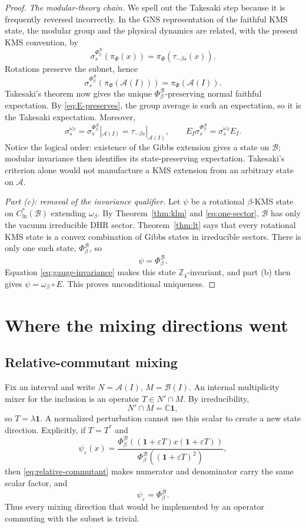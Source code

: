 \documentclass[11pt]{article}
\theoremstyle{remark}
\newcommand{\A}{\mathcal A}
\newcommand{\B}{\mathcal B}
\newcommand{\C}{\mathbb C}
\newcommand{\Z}{\mathbb Z}
\newcommand{\id}{\mathbf 1}
\begin{document}
\begin{proof}
\emph{The modular-theory chain.}
We spell out the Takesaki step because it is frequently reversed
incorrectly.  In the GNS representation of the faithful KMS state,
the modular group and the physical dynamics are related, with the
present KMS convention, by
\[
 \sigma_s^{\Phi_\beta^{\B}}(\pi_\Phi(x))
 =\pi_\Phi(\tau_{-\beta s}(x)).
\tag{4.6}\label{eq:kms-modular}
\]
Rotations preserve the subnet, hence
\[
 \sigma_s^{\Phi_\beta^{\B}}
   (\pi_\Phi(\A(I)))=\pi_\Phi(\A(I)).
\]
Takesaki's theorem now gives the unique
$\Phi_\beta^{\B}$-preserving normal faithful expectation.  By
\eqref{eq:E-preserves}, the group average is such an expectation, so
it is the Takesaki expectation.  Moreover,
\[
 \sigma_s^{\omega_\beta}
 =\sigma_s^{\Phi_\beta^{\B}}|_{\A(I)}
 =\tau_{-\beta s}|_{\A(I)},\qquad
 E_I\sigma_s^{\Phi_\beta^{\B}}
 =\sigma_s^{\omega_\beta}E_I.
\tag{4.7}\label{eq:modular-chain}
\]
Notice the logical order: existence of the Gibbs extension gives a
state on $\B$; modular invariance then identifies its
state-preserving expectation.  Takesaki's criterion alone would not
manufacture a KMS extension from an arbitrary state on $\A$.

\emph{Part (c): removal of the invariance qualifier.}
Let $\psi$ be a rotational $\beta$-KMS state on
$C^*_{\mathrm{ln}}(\B)$ extending $\omega_\beta$.  By
Theorem~\ref{thm:klm} and \eqref{eq:one-sector}, $\B$ has only the
vacuum irreducible DHR sector.  Theorem~\ref{thm:lt} says that every
rotational KMS state is a convex combination of Gibbs states in
irreducible sectors.  There is only one such state,
$\Phi_\beta^{\B}$, so
\[
 \psi=\Phi_\beta^{\B}.
\]
Equation \eqref{eq:gauge-invariance} makes this state
$\Z_4$-invariant, and part (b) then gives
$\psi=\omega_\beta\circ E$.  This proves unconditional uniqueness.
\end{proof}

\section{Where the mixing directions went}

\subsection{Relative-commutant mixing}

Fix an interval and write $N=\A(I)$, $M=\B(I)$.  An internal
multiplicity mixer for the inclusion is an operator $T\in N'\cap M$.
By irreducibility,
\[
 N'\cap M=\C\id,
\tag{5.1}\label{eq:relative-commutant}
\]
so $T=\lambda\id$.  A normalized perturbation cannot use this scalar
to create a new state direction.  Explicitly, if
$T=T^*$ and
\[
 \psi_\varepsilon(x)
 =\frac{\Phi_\beta^{\B}
 ((\id+\varepsilon T)x(\id+\varepsilon T))}
 {\Phi_\beta^{\B}((\id+\varepsilon T)^2)},
\]
then \eqref{eq:relative-commutant} makes numerator and denominator
carry the same scalar factor, and
\[
 \psi_\varepsilon=\Phi_\beta^{\B}.
\tag{5.2}\label{eq:scalar-pert}
\]
Thus every mixing direction that would be implemented by an
operator commuting with the subnet is trivial.
\end{document}
